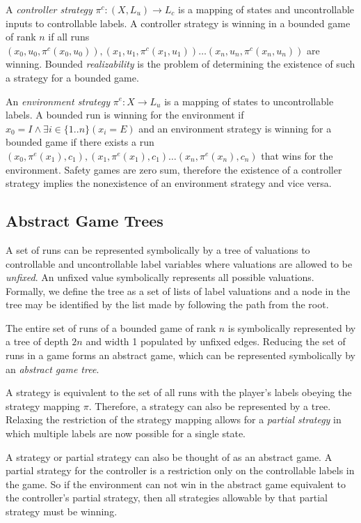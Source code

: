\documentclass{llncs}
\begin{document}
A \emph{controller strategy} $\pi^c : (X, L_u) \to L_c$ is a mapping of states
and uncontrollable inputs to controllable labels. A controller strategy is
winning in a bounded game of rank $n$ if all runs $(x_0, u_0, \pi^c(x_0, u_0)),
(x_1, u_1, \pi^c(x_1, u_1)) \dots (x_n, u_n, \pi^c(x_n, u_n))$ are winning.
Bounded \emph{realizability} is the problem of determining the existence of
such a strategy for a bounded game.

An \emph{environment strategy} $\pi^e : X \to L_u$ is a mapping of states to
uncontrollable labels. A bounded run is winning for the environment if $x_0
= I \land \exists i \in \{1..n\} (x_i = E)$ and an environment strategy is
winning for a bounded game if there exists a run $(x_0, \pi^e(x_1), c_1), (x_1,
\pi^e(x_1), c_1) \dots (x_n, \pi^e(x_n), c_n)$ that wins for the environment.
Safety games are zero sum, therefore the existence of a controller strategy
implies the nonexistence of an environment strategy and vice versa.

\subsection{Abstract Game Trees}

A set of runs can be represented symbolically by a tree of valuations to
controllable and uncontrollable label variables where valuations are allowed to
be \emph{unfixed}. An unfixed value symbolically represents all possible
valuations. Formally, we define the tree as a set of lists of label valuations
and a node in the tree may be identified by the list made by following the path
from the root.

The entire set of runs of a bounded game of rank $n$ is
symbolically represented by a tree of depth $2n$ and width 1 populated by
unfixed edges.  Reducing the set of runs in a game forms an abstract game,
which can be represented symbolically by an \emph{abstract game tree}.

A strategy is equivalent to the set of all runs with the player's labels
obeying the strategy mapping $\pi$. Therefore, a strategy can also be
represented by a tree. Relaxing the restriction of the strategy mapping allows
for a \emph{partial strategy} in which multiple labels are now possible for a
single state.

A strategy or partial strategy can also be thought of as an abstract game. A
partial strategy for the controller is a restriction only on the controllable
labels in the game. So if the environment can not win in the abstract game
equivalent to the controller's partial strategy, then all strategies allowable
by that partial strategy must be winning.
\end{document}
